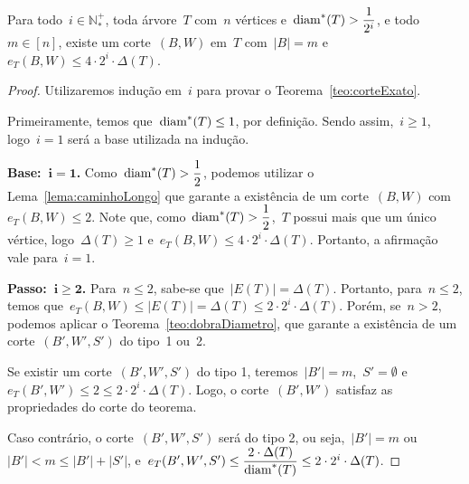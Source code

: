 	\begin{teo}
	\label{teo:corteExato}
		Para todo~${i\in \mathbb{N^+_*}}$, toda árvore~$T$ com~$n$
		vértices e~${\mathrm{diam}^*(T)>\dfrac{1}{2^i}}$, e todo~${m\in[n]}$,
		existe um corte~$(B,W)$ em~$T$ com~$|B|=m$ 
		e~$e_T(B,W)\le 4\cdot 2^i\cdot \Delta(T)$.
	\end{teo}

	\medskip
	\medskip

	\begin{proof}
		Utilizaremos indução em~$i$ para provar o Teorema~\ref{teo:corteExato}.
		
		Primeiramente, temos que~${\mathrm{diam}^*(T)\le1}$, por definição. 
		Sendo assim,~${i\ge1}$, logo~${i=1}$ será a base 
		utilizada na indução.
		
		\textbf{Base:~${\mathbf {i=1}}$.}
		Como~${\mathrm{diam}^*(T)>\dfrac{1}{2}}$,
		podemos utilizar o Lema~\ref{lema:caminhoLongo} que
		garante a existência de 
		um corte~$(B,W)$ 
		com~${e_T(B,W)\le 2}$.
		Note que, como~${\mathrm{diam}^*(T)>\dfrac{1}{2}}$,~$T$
		possui mais que um único vértice, logo~${\Delta(T)\ge 1}$
		e~${e_T(B,W)\le 4\cdot 2^i\cdot \Delta(T)}$.
		Portanto, a afirmação vale para~${i=1}$.


		\textbf{Passo:~${\mathbf{i\ge 2}}$.} 
		Para~${n\le 2}$, sabe-se que~${|E(T)|=\Delta(T)}$. 
		Portanto, para~${n\le 2}$, temos 
		que~${e_T(B,W)\le |E(T)|=\Delta(T)\le 2\cdot 2^i\cdot 
		\Delta(T)}$.
		Porém, se~${n>2}$, podemos aplicar o
		Teorema~\ref{teo:dobraDiametro}, que garante a existência 
		de um corte~$(B',W',S')$ do tipo~1 ou~2.

			Se existir um corte~$(B',W',S')$ do tipo 1, 
			teremos~${|B'|=m}$,~${S'=\emptyset}$
			e~${e_T(B',W')\le2\le 2\cdot 2^i\cdot \Delta(T)}$.
			Logo, o corte~$(B',W')$ satisfaz as propriedades
			do corte do teorema.

			Caso contrário, o corte~$(B',W',S')$ será do tipo 2, ou 
			seja,~${|B'|=m}$ ou~${|B'|<m\le |B'|+|S'|}$, 
			e~${e_T(B',W',S')\le \dfrac{2\cdot\Delta(T)}{\mathrm{diam}^*(T)}\le
			2\cdot2^i\cdot\Delta(T)}$.
			

\end{proof}
